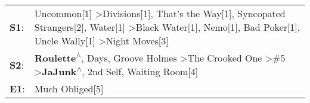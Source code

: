 \begin{supertabular}{p{0.03\textwidth}p{0.92\textwidth}}
 \textbf{S1}:  &  Uncommon[1]\textsuperscript{} \textgreater \enspace Divisions[1]\textsuperscript{}, \enspace That's the Way[1]\textsuperscript{}, \enspace Syncopated Strangers[2]\textsuperscript{}, \enspace Water[1]\textsuperscript{} \textgreater \enspace Black Water[1]\textsuperscript{}, \enspace Nemo[1]\textsuperscript{}, \enspace Bad Poker[1]\textsuperscript{}, \enspace Uncle Wally[1]\textsuperscript{} \textgreater \enspace Night Moves[3]\textsuperscript{}  \enspace  \\
 \textbf{S2}:  &                                                                                   \textbf{Roulette\textsuperscript{$\wedge$}},  Days\textsuperscript{}, \enspace Groove Holmes\textsuperscript{} \textgreater \enspace The Crooked One\textsuperscript{} \textgreater \enspace \#5\textsuperscript{} \textgreater \enspace \textbf{JaJunk\textsuperscript{$\wedge$}}, \enspace 2nd Self\textsuperscript{}, \enspace Waiting Room[4]\textsuperscript{}  \enspace  \\
 \textbf{E1}:  &                                                                                                                                                                                                                                                                                                                                                                                                                                Much Obliged[5]\textsuperscript{}  \enspace  \\
\end{supertabular}
